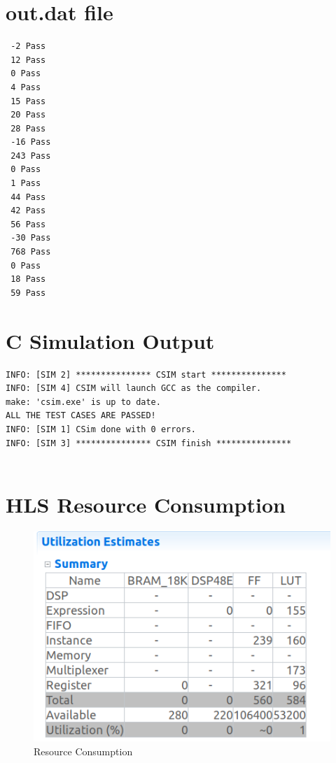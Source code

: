 \documentclass{article}
\begin{document}
\section{out.dat file}
\begin{lstlisting}
 -2 Pass
 12 Pass
 0 Pass
 4 Pass
 15 Pass
 20 Pass
 28 Pass
 -16 Pass
 243 Pass
 0 Pass
 1 Pass
 44 Pass
 42 Pass
 56 Pass
 -30 Pass
 768 Pass
 0 Pass
 18 Pass
 59 Pass

\end{lstlisting}
\vspace{5cm}


\section{C Simulation Output}
\begin{lstlisting}
INFO: [SIM 2] *************** CSIM start ***************
INFO: [SIM 4] CSIM will launch GCC as the compiler.
make: 'csim.exe' is up to date.
ALL THE TEST CASES ARE PASSED!
INFO: [SIM 1] CSim done with 0 errors.
INFO: [SIM 3] *************** CSIM finish ***************


\end{lstlisting}
\vspace{15cm}


\section{HLS Resource Consumption}
\vspace{3cm}
\begin{figure}[h]
    \centering
\includegraphics[width=\columnwidth]{1.png}
    \caption{Resource Consumption}
    \label{fig:my_label}
\end{figure}
\end{document}
